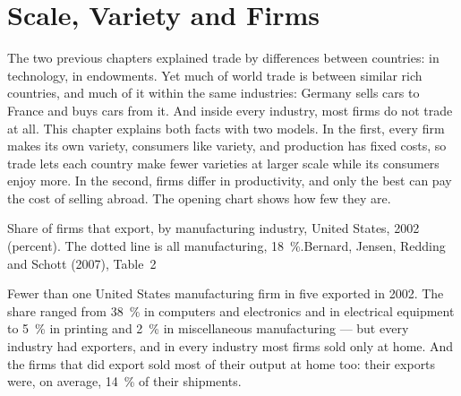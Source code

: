 \chapter{Scale, Variety and Firms}\label{ch:b3:scale-variety-firms}

The two previous chapters explained trade by differences between countries: in
technology, in endowments. Yet much of world trade is between similar rich
countries, and much of it within the same industries: Germany sells cars to
France and buys cars from it. And inside every industry, most firms do not trade
at all. This chapter explains both facts with two models. In the first, every
firm makes its own variety, consumers like variety, and production has fixed
costs, so trade lets each country make fewer varieties at larger scale while its
consumers enjoy more. In the second, firms differ in productivity, and only the
best can pay the cost of selling abroad. The opening chart shows how few they are.

\begin{openingchart}{Share of firms that export, by manufacturing industry, United
States, 2002 (percent). The dotted line is all manufacturing, 18~\%.}{Bernard,
Jensen, Redding and Schott (2007), Table~2}
\end{openingchart}

Fewer than one United States manufacturing firm in five exported in 2002. The share
ranged from 38~\% in computers and electronics and in electrical equipment to
5~\% in printing and 2~\% in miscellaneous manufacturing --- but every industry
had exporters, and in every industry most firms sold only at home. And the firms
that did export sold most of their output at home too: their exports were, on
average, 14~\% of their shipments.

